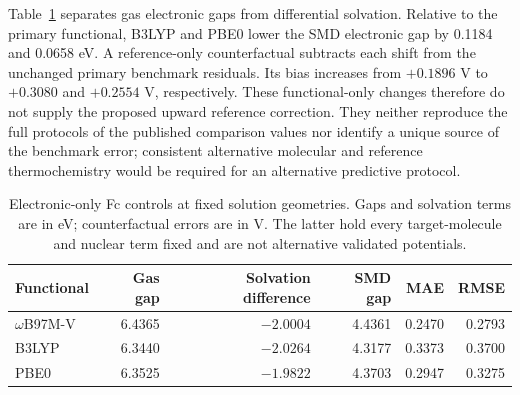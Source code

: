 \documentclass[11pt]{article}
\begin{document}
Table~\ref{tab:fc-functional} separates gas electronic gaps from differential solvation. Relative to the primary functional, B3LYP and PBE0 lower the SMD electronic gap by 0.1184 and 0.0658 eV. A reference-only counterfactual subtracts each shift from the unchanged primary benchmark residuals. Its bias increases from $+0.1896$ V to $+0.3080$ and $+0.2554$ V, respectively. These functional-only changes therefore do not supply the proposed upward reference correction. They neither reproduce the full protocols of the published comparison values nor identify a unique source of the benchmark error; consistent alternative molecular and reference thermochemistry would be required for an alternative predictive protocol.
\begin{table}[htbp]\centering\small
\caption{Electronic-only Fc controls at fixed solution geometries. Gaps and solvation terms are in eV; counterfactual errors are in V. The latter hold every target-molecule and nuclear term fixed and are not alternative validated potentials.}
\label{tab:fc-functional}
\begin{tabular}{lrrrrr}\toprule
Functional & Gas gap & Solvation difference & SMD gap & MAE & RMSE\\\midrule
$\omega$B97M-V & 6.4365 & $-2.0004$ & 4.4361 & 0.2470 & 0.2793\\
B3LYP & 6.3440 & $-2.0264$ & 4.3177 & 0.3373 & 0.3700\\
PBE0 & 6.3525 & $-1.9822$ & 4.3703 & 0.2947 & 0.3275\\\bottomrule
\end{tabular}\end{table}
\end{document}
